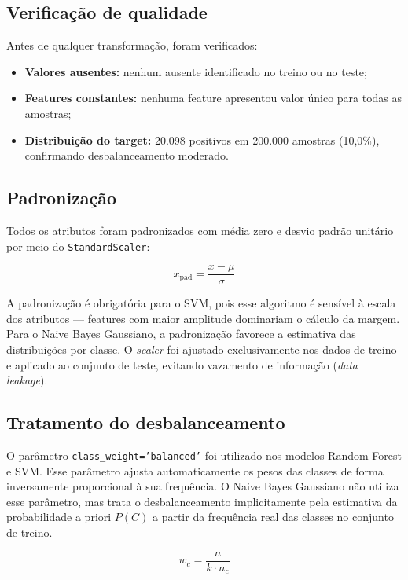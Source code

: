 \documentclass[a4paper,12pt]{article}
\begin{document}
\subsection{Verificação de qualidade}

Antes de qualquer transformação, foram verificados:

\begin{itemize}
    \item \textbf{Valores ausentes:} nenhum ausente identificado no treino ou no teste;
    \item \textbf{Features constantes:} nenhuma feature apresentou valor único para todas as amostras;
    \item \textbf{Distribuição do target:} 20.098 positivos em 200.000 amostras (10,0\%), confirmando desbalanceamento moderado.
\end{itemize}

\subsection{Padronização}

Todos os atributos foram padronizados com média zero e desvio padrão unitário por meio do \texttt{StandardScaler}:

\[
x_{\text{pad}} = \frac{x - \mu}{\sigma}
\]

A padronização é obrigatória para o SVM, pois esse algoritmo é sensível à escala dos atributos — features com maior amplitude dominariam o cálculo da margem. Para o Naive Bayes Gaussiano, a padronização favorece a estimativa das distribuições por classe. O \textit{scaler} foi ajustado exclusivamente nos dados de treino e aplicado ao conjunto de teste, evitando vazamento de informação (\textit{data leakage}).

\subsection{Tratamento do desbalanceamento}

O parâmetro \texttt{class\_weight='balanced'} foi utilizado nos modelos Random Forest e SVM. Esse parâmetro ajusta automaticamente os pesos das classes de forma inversamente proporcional à sua frequência. O Naive Bayes Gaussiano não utiliza esse parâmetro, mas trata o desbalanceamento implicitamente pela estimativa da probabilidade a priori $P(C)$ a partir da frequência real das classes no conjunto de treino.

\[
w_c = \frac{n}{k \cdot n_c}
\]
\end{document}
